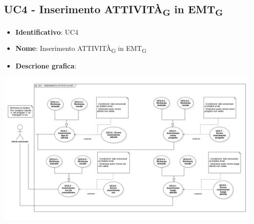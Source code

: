 \subsection{UC4 - Inserimento ATTIVITÀ\textsubscript{G} in EMT\textsubscript{G}}
\begin{itemize}
    \item \textbf{Identificativo}: UC4 
    \item \textbf{Nome}: Inserimento ATTIVITÀ\textsubscript{G} in EMT\textsubscript{G}
    \item \textbf{Descrione grafica}:
\end{itemize}
\begin{center}
    \includegraphics[scale=0.40]{images/UC4.png} 
\end{center}

